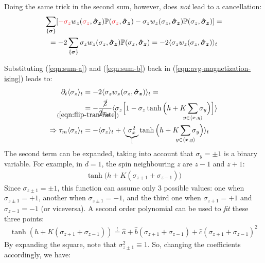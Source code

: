 \documentclass[../../main.tex]{subfiles}
\begin{document}
Doing the same trick in the second sum, however, does \textit{not} lead to a cancellation:
\begin{align} \nonumber
    \sum_{\{\bm{\sigma}\}} [\textcolor{Red}{-\sigma_z} w_z(\textcolor{Red}{\sigma_z}, \bm{\hat{\sigma}_z}) \mathbb{P}(\textcolor{Red}{\sigma_z}, \bm{\hat{\sigma}_z}) - \sigma_z w_z(\sigma_z, \bm{\hat{\sigma}_z}) \mathbb{P}(\sigma_z, \bm{\hat{\sigma}_z})] = \span \\
    = -2 \sum_{\{\bm{\sigma}\}} \sigma_z w_z(\sigma_z, \bm{\hat{\sigma}_z}) \mathbb{P}(\sigma_z, \bm{\hat{\sigma}_z}) = -2 \langle \sigma_z w_z(\sigma_z, \bm{\hat{\sigma}_z}) \rangle_t \span \label{eqn:sum-b}
\end{align}

Substituting (\ref{eqn:sum-a}) and (\ref{eqn:sum-b}) back in (\ref{eqn:avg-magnetization-ising}) leads to:
\begin{align} \nonumber
    \partial_t \langle \sigma_z \rangle_t &= -2 \langle \sigma_z w_z(\sigma_z, \bm{\hat{\sigma}_z}) \rangle_t =\\ \nonumber
    &\underset{\mathclap{(\ref{eqn:flip-tran-rate})}}{=}  -\frac{\cancel{2}}{\cancel{2} \tau_m} \langle \sigma_z \Big[1 - \sigma_z \tanh\Big(h + K \sum_{\mathclap{y \in \langle x,y \rangle}} \sigma_y \Big)\Big] \rangle\\
    \Rightarrow \tau_m \langle \sigma_z \rangle_t &= -\langle \sigma_z \rangle_t + \langle \underbrace{\sigma_x^2}_{1}  \tanh \Big(h + K \sum_{\mathclap{y \in \langle x,y \rangle}} \sigma_y\Big) \rangle_t \label{eqn:avg-mag-z}
\end{align}
The second term can be expanded, taking into account that $\sigma_y = \pm 1$ is a binary variable. For example, in $d=1$, the spin neighbouring $z$ are $z-1$ and $z+1$:
\begin{align*}
    \tanh\Big(h + K(\sigma_{z+1} + \sigma_{z-1})\Big)
\end{align*}
Since $\sigma_{z\pm 1} = \pm 1$, this function can assume only $3$ possible values: one when $\sigma_{z\pm1} = +1$, another when $\sigma_{z \pm 1} = -1$, and the third one when $\sigma_{z+1} = +1$ and $\sigma_{z-1} = -1$ (or viceversa). A second order polynomial can be used to \textit{fit} these three points:
\begin{align*}
    \tanh(h + K(\sigma_{z+1} + \sigma_{z-1})) \overset{!}{=}  \hat{a} + \hat{b} (\sigma_{z+1} + \sigma_{z-1}) + \hat{c} (\sigma_{z+1} + \sigma_{z-1})^2
\end{align*} 
By expanding the square, note that $\sigma_{z \pm 1}^2 \equiv 1$. So, changing the coefficients accordingly, we have:
\end{document}

